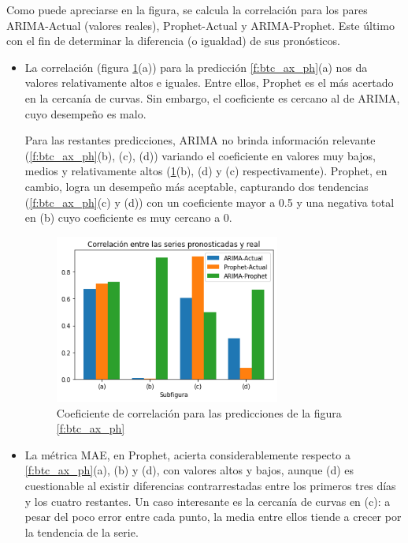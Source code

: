 \documentclass[a4paper,10pt]{article}
\begin{document}
Como puede apreciarse en la figura, se calcula la correlación para los pares ARIMA-Actual (valores reales), Prophet-Actual y ARIMA-Prophet. Este último con el fin de determinar la diferencia (o igualdad) de sus pronósticos.

\begin{itemize}

 \item La correlación (figura \ref{f:corr}(a)) para la predicción \ref{f:btc_ax_ph}(a) nos da valores relativamente altos e iguales. Entre ellos, Prophet es el más acertado en la cercanía de curvas. Sin embargo, el coeficiente es cercano al de ARIMA, cuyo desempeño es malo.

 Para las restantes predicciones, ARIMA no brinda información relevante (\ref{f:btc_ax_ph}(b), (c), (d)) variando el coeficiente en valores muy bajos, medios y relativamente altos (\ref{f:corr}(b), (d) y (c) respectivamente). Prophet, en cambio, logra un desempeño más aceptable, capturando dos tendencias (\ref{f:btc_ax_ph}(c) y (d)) con un coeficiente mayor a 0.5 y una negativa total en (b) cuyo coeficiente es muy cercano a 0.

 \begin{figure}[H]
 \centering
  \includegraphics[width=0.7\textwidth]{./plots/btc_ax_ph/corr}
  \caption{Coeficiente de correlación para las predicciones de la figura \ref{f:btc_ax_ph}}
  \label{f:corr}
\end{figure}

 \item La métrica MAE, en Prophet, acierta considerablemente respecto a \ref{f:btc_ax_ph}(a), (b) y (d), con valores altos y bajos, aunque (d) es cuestionable al existir diferencias contrarrestadas entre los primeros tres días y los cuatro restantes. Un caso interesante es la cercanía de curvas en (c): a pesar del poco error entre cada punto, la media entre ellos tiende a crecer por la tendencia de la serie.


\end{itemize}
\end{document}
